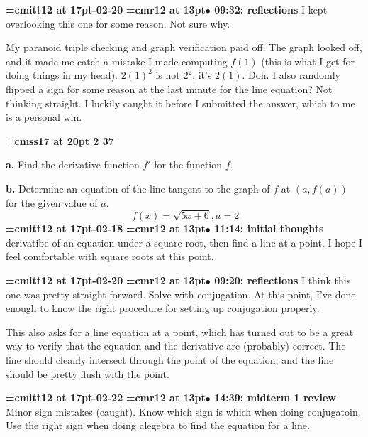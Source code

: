 {\medskip\noindent\bf\font\titlefont=cmitt12 at 17pt-02-20}\medskip
{\smallskip\noindent\bf\font\titlefont=cmr12 at 13pt\titlefont $\bullet$ 09:32: reflections}\smallskip
I kept overlooking this one for some reason. Not sure why.
\par

My paranoid triple checking and graph verification paid off. The graph looked off, and it made me catch a mistake I made computing $f(1)$ (this is what I get for doing things in my head). $2(1)^2$ is not $2^2$, it's $2(1)$. Doh. I also randomly flipped a sign for some reason at the last minute for the line equation? Not thinking straight. I luckily caught it before I submitted the answer, which to me is a personal win.
\par

{\medskip\noindent\bf\font\titlefont=cmss17 at 20pt 2 37}\medskip
\par {\bf a.} Find the derivative function $f'$ for the
function $f$.
\par {\bf b.} Determine an equation of the line tangent to the
graph of $f$ at $(a, f(a))$ for the given value of $a$.
$$\
f(x) = \sqrt{5x + 6}, a = 2
$$
{\medskip\noindent\bf\font\titlefont=cmitt12 at 17pt-02-18}\medskip
{\smallskip\noindent\bf\font\titlefont=cmr12 at 13pt\titlefont $\bullet$ 11:14: initial thoughts}\smallskip
derivatibe of an equation under a square root, then find a line at a point. I hope I feel comfortable with square roots at this point.
\par

{\medskip\noindent\bf\font\titlefont=cmitt12 at 17pt-02-20}\medskip
{\smallskip\noindent\bf\font\titlefont=cmr12 at 13pt\titlefont $\bullet$ 09:20: reflections}\smallskip
I think this one was pretty straight forward. Solve with conjugation. At this point, I've done enough to know the right procedure for setting up conjugation properly.
\par

This also asks for a line equation at a point, which has turned out to be a great way to verify that the equation and the derivative are (probably) correct. The line should cleanly intersect through the point of the equation, and the line should be pretty flush with the point.
\par

{\medskip\noindent\bf\font\titlefont=cmitt12 at 17pt-02-22}\medskip
{\smallskip\noindent\bf\font\titlefont=cmr12 at 13pt\titlefont $\bullet$ 14:39: midterm 1 review}\smallskip
Minor sign mistakes (caught). Know which sign is which when doing conjugatoin. Use the right sign when doing alegebra to find the equation for a line.
\par

